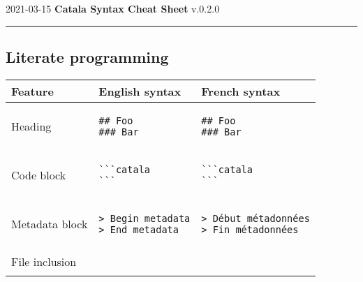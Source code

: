 \documentclass[a3paper,landscape]{article}
\begin{document}
\begin{center}
2021-03-15
\hfill
{\Huge\bfseries\sffamily
Catala Syntax Cheat Sheet}
\hfill
v.0.2.0
\end{center}
\hrule

\begin{multicols*}{2}

\section*{Literate programming}
\begin{center}
\begin{tabular}{p{}p{}p{}}
\toprule
Feature&English syntax&French syntax\\\midrule
Heading&
\vspace*{-1.75em}
\begin{verbatim}
## Foo
### Bar
\end{verbatim}
\vspace*{-1.75em}
&
\vspace*{-1.75em}
\begin{verbatim}
## Foo
### Bar
\end{verbatim}
\vspace*{-1.75em}
\\
Code block&
\vspace*{-1.75em}
\begin{verbatim}
```catala
```
\end{verbatim}
\vspace*{-1.75em}
&
\vspace*{-1.75em}
\begin{verbatim}
```catala
```
\end{verbatim}
\vspace*{-1.75em}
\\
Metadata block&
\vspace*{-1.75em}
\begin{verbatim}
> Begin metadata
> End metadata
\end{verbatim}
\vspace*{-1.75em}
&
\vspace*{-1.75em}
\begin{verbatim}
> Début métadonnées
> Fin métadonnées
\end{verbatim}
\vspace*{-1.75em}
\\
File inclusion&
\vspace*{-1.75em}
\begin{verbatim}

\end{verbatim}
\end{tabular}
\end{center}
\end{multicols*}
\end{document}

